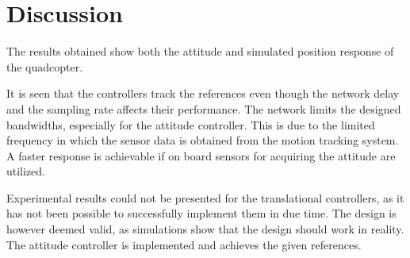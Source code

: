 \section{Discussion}\label{sec:discussion}

The results obtained show both the attitude and simulated position response of the quadcopter. 

It is seen that the controllers track the references even though the network delay and the sampling rate affects their performance. The network limits the designed bandwidths, especially for the attitude controller. This is due to the limited frequency in which the sensor data is obtained from the motion tracking system. A faster response is achievable if on board sensors for acquiring the attitude are utilized.

Experimental results could not be presented for the translational controllers, as it has not been possible to successfully implement them in due time. The design is however deemed valid, as simulations show that the design should work in reality. The attitude controller is implemented and achieves the given references.

%
